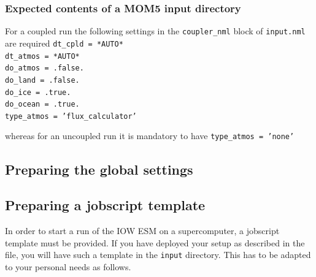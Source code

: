 \documentclass[a4paper,titlepage]{scrartcl}
\begin{document}
\subsubsection{Expected contents of a MOM5 input directory}
For a coupled run the following settings in the \texttt{coupler\_nml} block of \texttt{input.nml} are required
\texttt{dt\_cpld  = *AUTO*} \\
\texttt{dt\_atmos = *AUTO*} \\
\texttt{do\_atmos = .false.} \\
\texttt{do\_land = .false.} \\
\texttt{do\_ice = .true.} \\
\texttt{do\_ocean = .true.} \\
\texttt{type\_atmos = 'flux\_calculator'}

whereas for an uncoupled run it is mandatory to have
\texttt{type\_atmos = 'none'}

\subsection{Preparing the global settings}

\subsection{Preparing a jobscript template}

In order to start a run of the IOW ESM on a supercomputer, a jobscript template must be provided.
If you have deployed your setup as described in the \Readme file, you will have such a template in the \texttt{input} directory.
This has to be adapted to your personal needs as follows.
\end{document}

